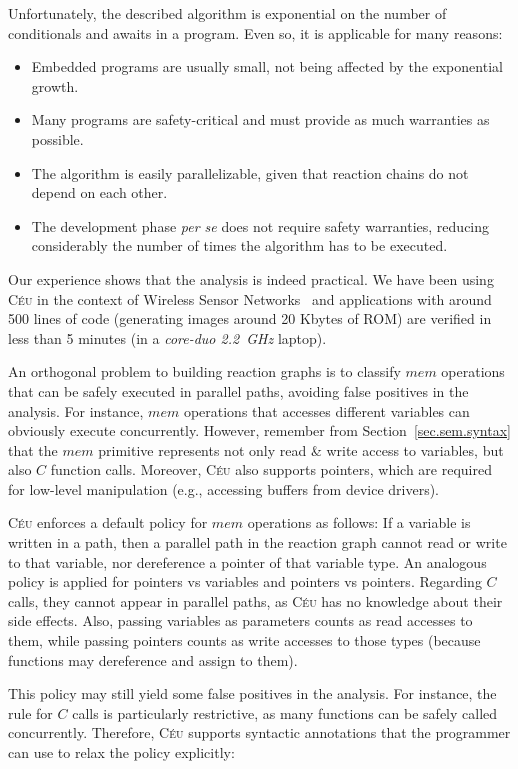 \documentclass[preprint]{sigplanconf}
\newcommand{\CEU}{\textsc{C\'{e}u}\xspace}
\newcommand{\1}{\;}
\newcommand{\2}{\;\;}
\newcommand{\3}{\;\;\;}
\newcommand{\5}{\;\;\;\;\;}
\begin{document}
Unfortunately, the described algorithm is exponential on the number of 
conditionals and awaits in a program.
Even so, it is applicable for many reasons:

\begin{itemize}
\item Embedded programs are usually small, not being affected by the 
exponential growth.
\item Many programs are safety-critical and must provide as much warranties as 
    possible.
\item The algorithm is easily parallelizable, given that reaction chains do not 
    depend on each other.
\item The development phase \emph{per se} does not require safety warranties, 
reducing considerably the number of times the algorithm has to be executed.
\end{itemize}

Our experience shows that the analysis is indeed practical.
We have been using \CEU in the context of Wireless Sensor 
Networks~\cite{wsn.survey} and applications with around 500 lines of code 
(generating images around 20 Kbytes of ROM) are verified in less than 5 minutes 
(in a \emph{core-duo 2.2~GHz} laptop).

An orthogonal problem to building reaction graphs is to classify $mem$ 
operations that can be safely executed in parallel paths, avoiding false 
positives in the analysis.
For instance, $mem$ operations that accesses different variables can obviously 
execute concurrently.
However, remember from Section~\ref{sec.sem.syntax} that the $mem$ primitive 
represents not only read \& write access to variables, but also $C$ function 
calls.
Moreover, \CEU also supports pointers, which are required for low-level 
manipulation (e.g., accessing buffers from device drivers).

\CEU enforces a default policy for $mem$ operations as follows:
If a variable is written in a path, then a parallel path in the reaction graph 
cannot read or write to that variable, nor dereference a pointer of that 
variable type.
An analogous policy is applied for pointers vs variables and pointers vs 
pointers.
Regarding $C$ calls, they cannot appear in parallel paths, as \CEU has no 
knowledge about their side effects.
Also, passing variables as parameters counts as read accesses to them, while 
passing pointers counts as write accesses to those types (because functions may 
dereference and assign to them).

This policy may still yield some false positives in the analysis.
For instance, the rule for $C$ calls is particularly restrictive, as many 
functions can be safely called concurrently.
Therefore, \CEU supports syntactic annotations that the programmer can use to 
relax the policy explicitly:
\end{document}
